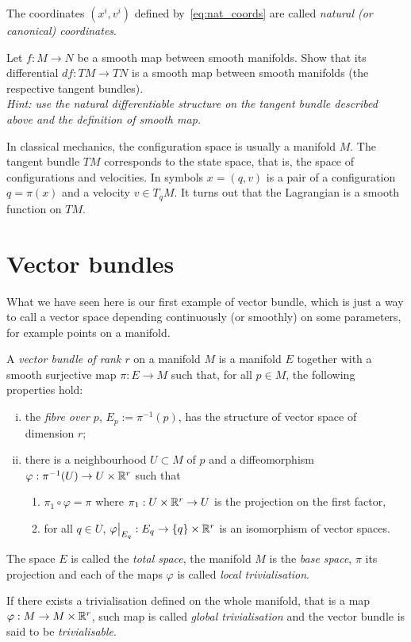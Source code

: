The coordinates $(x^i, v^i)$ defined by~\eqref{eq:nat_coords} are called \emph{natural (or canonical) coordinates}.

\begin{exercise}
  Let $f:M\to N$ be a smooth map between smooth manifolds.
  Show that its differential $df: TM \to TN$ is a smooth map between smooth manifolds (the respective tangent bundles).\\
  \textit{\small Hint: use the natural differentiable structure on the tangent bundle described above and the definition of smooth map.}
\end{exercise}

\begin{remark}
  In classical mechanics, the configuration space is usually a manifold $M$.
  The tangent bundle $TM$ corresponds to the state space, that is, the space of configurations and velocities. In symbols $x=(q,v)$ is a pair of a configuration $q = \pi(x)$ and a velocity $v\in T_q M$.
  It turns out that the Lagrangian is a smooth function on $TM$.
\end{remark}

\section{Vector bundles}\label{sec:vectorbundle}

What we have seen here is our first example of vector bundle, which is just a way to call a vector space depending continuously (or smoothly) on some parameters, for example points on a manifold.

\begin{definition}\label{def:vector_bundle}
  A \emph{vector bundle of rank $r$} on a manifold $M$ is a manifold $E$ together with a smooth surjective map $\pi : E \to M$ such that, for all $p\in M$, the following properties hold:
  \begin{enumerate}[(i)]
    \item the \emph{fibre over $p$}, $E_p := \pi^{-1}(p)$, has the structure of vector space of dimension $r$;
    \item there is a neighbourhood $U\subset M$ of $p$ and a diffeomorphism $\varphi: \pi^{-1}(U) \to U \times \mathbb{R}^r$ such that
    \begin{enumerate}
      \item $\pi_1 \circ \varphi = \pi$ where $\pi_1: U\times\mathbb{R}^r\to U$ is the projection on the first factor,
      \item for all $q\in U$, $\varphi\big|_{E_q} : E_q \to \{q\}\times \mathbb{R}^r$ is an isomorphism of vector spaces.
    \end{enumerate}
  \end{enumerate}

  The space $E$ is called the \emph{total space}, the manifold $M$ is the \emph{base space}, $\pi$ its projection and each of the maps $\varphi$ is called \emph{local trivialisation}.

  If there exists a trivialisation defined on the whole manifold, that is a map $\varphi: M \to M\times \mathbb{R}^r$, such map is called \emph{global trivialisation} and the vector bundle is said to be \emph{trivialisable}.
\end{definition}

